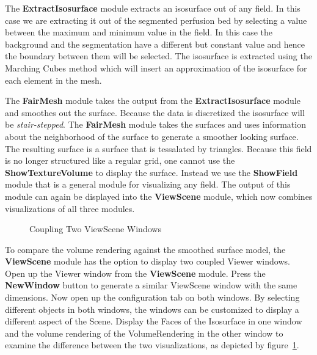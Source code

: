 \documentclass[fleqn,11pt,openany]{book}
\begin{document}
The {\bf ExtractIsosurface} module extracts an isosurface out of any field. In this case we are extracting it out of the segmented perfusion bed by selecting a value between the maximum and minimum value in the field. In this case the background and the segmentation have a different but constant value and hence the boundary between them will be selected. The isosurface is extracted using the Marching Cubes method which will insert an approximation of the isosurface for each element in the mesh.

The {\bf FairMesh} module takes the output from the {\bf ExtractIsosurface} module and smoothes out the surface. Because the data is discretized the isosurface will be {\em stair-stepped}. The {\bf FairMesh} module takes the surfaces and uses information about the neighborhood of the surface to generate a smoother looking surface. The resulting surface is a surface that is tessalated by triangles. Because this field is no longer structured like a regular grid, one cannot use the {\bf ShowTextureVolume} to display the surface. Instead we use the  {\bf ShowField} module that is a general module for visualizing any field. The output of this module can again be displayed into the {\bf ViewScene} module, which now combines visualizations of all three modules.

\begin{figure}
\caption{Coupling Two ViewScene Windows}\label{fig:TwoViewers}
\end{figure}

To compare the volume rendering against the smoothed surface model, the {\bf ViewScene} module has the option to display two coupled Viewer windows. Open up the Viewer window from the {\bf ViewScene} module. Press the {\bf NewWindow} button to generate a similar ViewScene window with the same dimensions. Now open up the configuration tab on both windows. By selecting different objects in both windows, the windows can be customized to display a different aspect of the Scene. Display the Faces of the Isosurface in one window and the volume rendering of the VolumeRendering in the other window to examine the difference between the two visualizations, as depicted by figure~\ref{fig:TwoViewers}.
\end{document}

